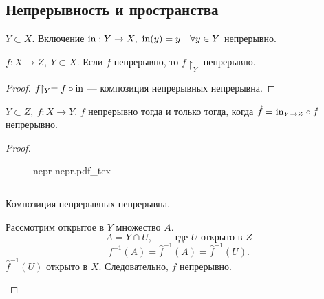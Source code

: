 \documentclass[11pt]{book}
\newcommand{\incfig}[1]{%
    \def\svgwidth{\columnwidth}
    {#1.pdf_tex}
}
\theoremstyle{definition}
\theoremstyle{plain}
\theoremstyle{plain}
\theoremstyle{definition}
\theoremstyle{remark}
\begin{document}
\subsection{Непрерывность и пространства}
\begin{thm}
    $ Y \subset X$.
    Включение  $ {\rm in}: Y \to  X, ~ {\rm in}(y) = y \quad \forall  y \in Y$ непрерывно.
\end{thm}
\begin{thm}
    $ f: X \to  Z, ~ Y \subset X$.
    Если $ f$ непрерывно, то  $ f\!\!\upharpoonright_Y$ непрерывно.
\end{thm}
\begin{proof}
    $ f\!\!\upharpoonright_Y = f \circ {\rm in}$ --- композиция непрерывных непрерывна.
\end{proof}
\begin{thm}
    $ Y \subset  Z, ~ f: X \to  Y$. $ f$ непрерывно  тогда и только тогда, когда  $\hat{f} = {\rm in}_{Y \to Z} \circ f$ непрерывно.
\end{thm}
\begin{proof}
\begin{figure}[ht]
    \centering
    \incfig{nepr-nepr}
    \label{fig:nepr-nepr}
\end{figure}
$ $
\begin{description}
    \item {} 
	Композиция непрерывных непрерывна.
    \item {} 
	Рассмотрим  открытое в $ Y$ множество $ A$. 
	$$ A = Y \cap U, \qquad \text{ где } U  \text{ открыто в } Z$$  
	\[
	    f^{-1}(A) = \hat{f}^{-1}(A) = \hat{f}^{-1}(U) 
	.\] 
	$ \hat{f}^{-1}(U)$ открыто в $ X$. Следовательно, $ f$ непрерывно.
\end{description} 
\end{proof}
\end{document}
